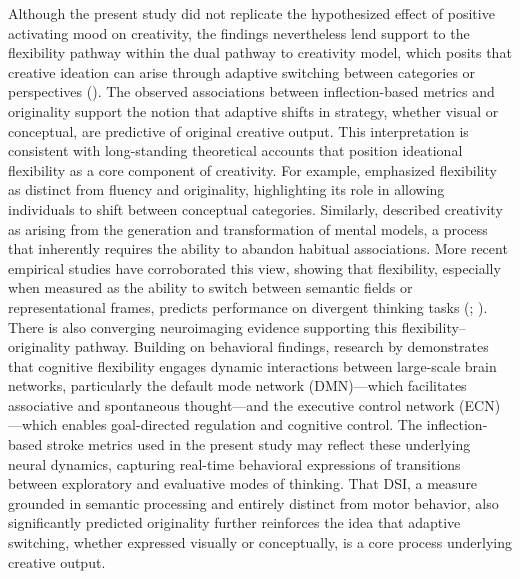 \documentclass[../MA_Thesis.tex]{subfiles}
\begin{document}
Although the present study did not replicate the hypothesized effect of positive activating mood on creativity, the findings nevertheless lend support to the flexibility pathway within the dual pathway to creativity model, which posits that creative ideation can arise through adaptive switching between categories or perspectives (\cite{nijstad_dual_2010}). The observed associations between inflection-based metrics and originality support the notion that adaptive shifts in strategy, whether visual or conceptual, are predictive of original creative output. This interpretation is consistent with long-standing theoretical accounts that position ideational flexibility as a core component of creativity. For example, \textcite{guilford_nature_1967} emphasized flexibility as distinct from fluency and originality, highlighting its role in allowing individuals to shift between conceptual categories. Similarly, \textcite{johnson-laird_freedom_1988} described creativity as arising from the generation and transformation of mental models, a process that inherently requires the ability to abandon habitual associations. More recent empirical studies have corroborated this view, showing that flexibility, especially when measured as the ability to switch between semantic fields or representational frames, predicts performance on divergent thinking tasks (\cite{benedek_differential_2012}; \cite{kenett_structure_2016}). There is also converging neuroimaging evidence supporting this flexibility–originality pathway. Building on behavioral findings, research by \textcite{beaty_creative_2016} demonstrates that cognitive flexibility engages dynamic interactions between large-scale brain networks, particularly the default mode network (DMN)—which facilitates associative and spontaneous thought—and the executive control network (ECN)—which enables goal-directed regulation and cognitive control. The inflection-based stroke metrics used in the present study may reflect these underlying neural dynamics, capturing real-time behavioral expressions of transitions between exploratory and evaluative modes of thinking. That DSI, a measure grounded in semantic processing and entirely distinct from motor behavior, also significantly predicted originality further reinforces the idea that adaptive switching, whether expressed visually or conceptually, is a core process underlying creative output.
\end{document}
